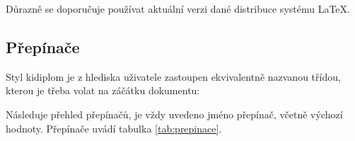\documentclass[
  field=inf,
  biblatex,
  glossaries,
  index
]{kidiplom}
\begin{document}
Důrazně se doporučuje používat aktuální verzi dané distribuce systému \LaTeX{}.


\subsection{Přepínače}
Styl kidiplom je z hlediska uživatele zastoupen ekvivalentně nazvanou třídou, kterou je třeba volat na záčátku dokumentu:

Následuje přehled přepínačů, je vždy uvedeno jméno přepínač, včetně výchozí hodnoty. Přepínače uvádí tabulka \ref{tab:prepinace}.
\end{document}
